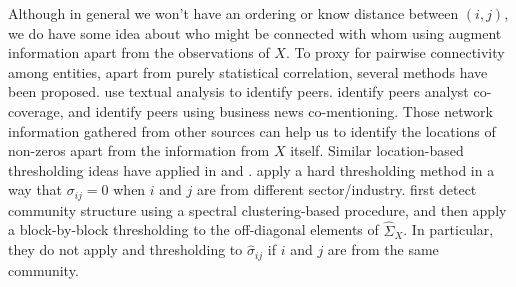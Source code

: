 

Although in general we won't have an ordering or know distance between \((i,j)\), we do have some idea about who might be connected with whom using augment information apart from the observations of ${X}$. To proxy for pairwise connectivity among entities, apart from purely statistical correlation, several methods have been proposed. 
\cite{hoberg2016text} use textual analysis to identify peers. \cite{kaustia2013common} identify peers analyst co-coverage, and \cite{ge2021news} identify peers using business news co-mentioning. 
Those network information gathered from other sources can help us to identify the locations of non-zeros apart from the information from ${X}$ itself. Similar location-based thresholding ideas have applied in \cite{fan2016incorporating} and \cite{brownlees2020community}. \cite{fan2016incorporating} apply a hard thresholding method in a way that $\sigma_{ij}=0$ when $i$ and $j$ are from different sector/industry. 
\cite{brownlees2020community} first detect community structure using a spectral clustering-based procedure, and then apply a block-by-block thresholding to the off-diagonal elements of ${\hat{\Sigma}_{X}}$. In particular, they do not apply and thresholding to $\hat{\sigma}_{ij}$ if $i$ and $j$ are from the same community.

